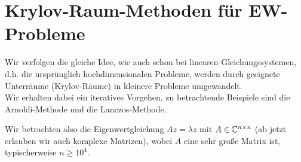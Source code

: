 
\section{Krylov-Raum-Methoden für EW-Probleme}
Wir verfolgen die gleiche Idee, wie auch schon bei linearen Gleichungssystemen, d.h. die ursprünglich hochdimensionalen
Probleme, werden durch geeignete Unterräume (Krylov-Räume) in kleinere Probleme umgewandelt. \\
Wir erhalten dabei ein iteratives Vorgehen, zu betrachtende Beispiele sind die Arnoldi-Methode und die 
Lanczos-Methode.

Wir betrachten also die Eigenwertgleichung $Az=\lambda z$ mit $A\in\mathbb C  ^{n\times n}$ 
(ab jetzt erlauben wir auch komplexe Matrizen), wobei $A$ eine sehr große
Matrix ist, typischerweise $n\geq 10^4$.
